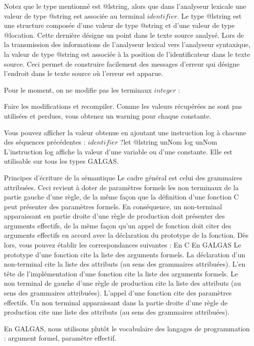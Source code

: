 Notez que le type mentionné est @lstring, alors que dans l’analyseur lexicale une valeur de type @string est associée au terminal $identifier$. Le type @lstring est une structure composée d’une valeur de type @string et d’une valeur de type @location. Cette dernière désigne un point dans le texte source analysé. Lors de la transmission des informations de l’analyseur lexical vers l’analyseur syntaxique, la valeur de type @string est associée à la position de l’identificateur dans le texte source. Ceci permet de construire facilement des messages d’erreur qui désigne l’endroit dans le texte source où l’erreur est apparue.

Pour le moment, on ne modifie pas les terminaux $integer$ :

Faire les modifications et recompiler. Comme les valeurs récupérées ne sont pas utilisées et perdues, vous obtenez un warning pour chaque constante.

Vous pouvez afficher la valeur obtenue en ajoutant une instruction log à chacune des séquences précédentes :
$identifier$ ?let @lstring unNom
log unNom
L'instruction log affiche la valeur d'une variable ou d’une constante. Elle est utilisable sur tous les types GALGAS.

Principes d'écriture de la sémantique
Le cadre général est celui des grammaires attribuées. Ceci revient à doter de paramètres formels les non terminaux de la partie gauche d'une règle, de la même façon que la définition d'une fonction C peut présenter des paramètres formels. En conséquence, un non-terminal apparaissant en partie droite d'une règle de production doit présenter des arguments effectifs, de la même façon qu'un appel de fonction doit citer des arguments effectifs en accord avec la déclaration du prototype de la fonction. Dès lors, vous pouvez établir les correspondances suivantes :
En C	En GALGAS
Le prototype d'une fonction cite la liste des arguments formels.	La déclaration d'un non-terminal cite la liste des attributs (au sens des grammaires attribuées).
L'en tête de l'implémentation d'une fonction cite la liste des arguments formels.	Le non terminal de gauche d'une règle de production cite la liste des attributs (au sens des grammaires attribuées).
L'appel d'une fonction cite des paramètres effectifs.	Un non terminal apparaissant dans la partie droite d'une règle de production cite une liste des attributs (au sens des grammaires attribuées).

En GALGAS, nous utilisons plutôt le vocabulaire des langages de programmation : argument formel, paramètre effectif.


